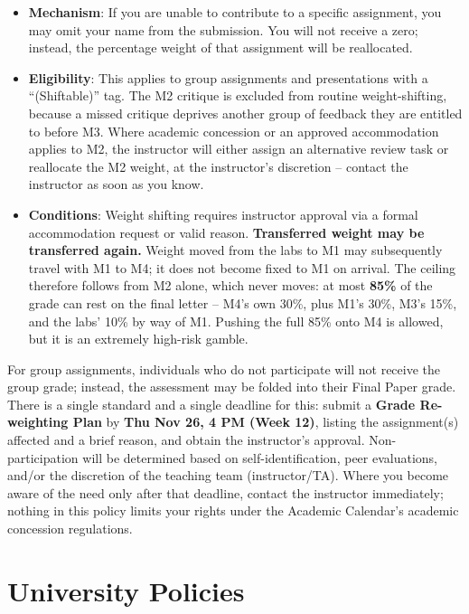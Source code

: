 \documentclass[
]{article}
\providecommand{\tightlist}{%
  \setlength{\itemsep}{0pt}\setlength{\parskip}{0pt}}
\begin{document}
\begin{itemize}
\tightlist
\item
  \textbf{Mechanism}: If you are unable to contribute to a specific
  assignment, you may omit your name from the submission. You will not
  receive a zero; instead, the percentage weight of that assignment will
  be reallocated.
\item
  \textbf{Eligibility}: This applies to group assignments and
  presentations with a ``(Shiftable)'' tag. The M2 critique is excluded
  from routine weight-shifting, because a missed critique deprives
  another group of feedback they are entitled to before M3. Where
  academic concession or an approved accommodation applies to M2, the
  instructor will either assign an alternative review task or reallocate
  the M2 weight, at the instructor's discretion -- contact the
  instructor as soon as you know.
\item
  \textbf{Conditions}: Weight shifting requires instructor approval via
  a formal accommodation request or valid reason. \textbf{Transferred
  weight may be transferred again.} Weight moved from the labs to M1 may
  subsequently travel with M1 to M4; it does not become fixed to M1 on
  arrival. The ceiling therefore follows from M2 alone, which never
  moves: at most \textbf{85\%} of the grade can rest on the final letter
  -- M4's own 30\%, plus M1's 30\%, M3's 15\%, and the labs' 10\% by way
  of M1. Pushing the full 85\% onto M4 is allowed, but it is an
  extremely high-risk gamble.
\end{itemize}

For group assignments, individuals who do not participate will not
receive the group grade; instead, the assessment may be folded into
their Final Paper grade. There is a single standard and a single
deadline for this: submit a \textbf{Grade Re-weighting Plan} by
\textbf{Thu Nov 26, 4 PM (Week 12)}, listing the assignment(s) affected
and a brief reason, and obtain the instructor's approval.
Non-participation will be determined based on self-identification, peer
evaluations, and/or the discretion of the teaching team (instructor/TA).
Where you become aware of the need only after that deadline, contact the
instructor immediately; nothing in this policy limits your rights under
the Academic Calendar's academic concession regulations.

\section{University Policies}\label{university-policies}
\end{document}
